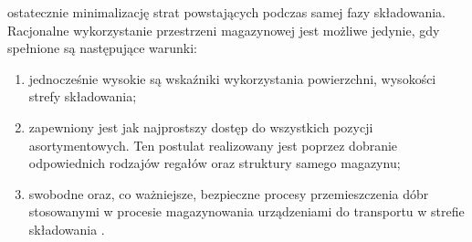 	ostatecznie minimalizację strat powstających podczas samej fazy składowania. Racjonalne wykorzystanie
	przestrzeni magazynowej jest możliwe jedynie, gdy spełnione są następujące warunki:
	\begin{enumerate}
		\item jednocześnie wysokie są wskaźniki wykorzystania powierzchni, wysokości strefy składowania;
		\item zapewniony jest jak najprostszy dostęp do wszystkich pozycji asortymentowych. Ten postulat
		realizowany jest poprzez dobranie odpowiednich rodzajów regałów oraz struktury samego magazynu;
		\item swobodne oraz, co ważniejsze, bezpieczne procesy przemieszczenia dóbr stosowanymi
		w procesie magazynowania urządzeniami do transportu w strefie składowania \cite{logistyka_w_przedsiebiorstwie}.
	\end{enumerate}